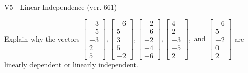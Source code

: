 \begin{exercise}
  \begin{exerciseTitle}V5 - Linear Independence (ver. 661)\end{exerciseTitle}
  \begin{exerciseStatement}
    Explain why the vectors \(\left[\begin{array}{r}
-3 \\
-5 \\
-3 \\
2 \\
5
\end{array}\right] , \left[\begin{array}{r}
-6 \\
5 \\
3 \\
5 \\
-2
\end{array}\right] , \left[\begin{array}{r}
-2 \\
-6 \\
-2 \\
-4 \\
-6
\end{array}\right] , \left[\begin{array}{r}
4 \\
2 \\
-3 \\
-5 \\
2
\end{array}\right] , \text{ and } \left[\begin{array}{r}
-6 \\
5 \\
-2 \\
0 \\
2
\end{array}\right]\) are linearly dependent or linearly independent.	



\end{exerciseStatement}
\end{exercise}
